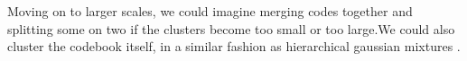 \documentclass{article}
\begin{document}
Moving on to larger scales, we could imagine merging codes together and
splitting some on two if the clusters become too small or too large.We could
also cluster the codebook itself, in a similar fashion as hierarchical
gaussian mixtures \cite{Vasconcelos2001}.


\small



\end{document}
